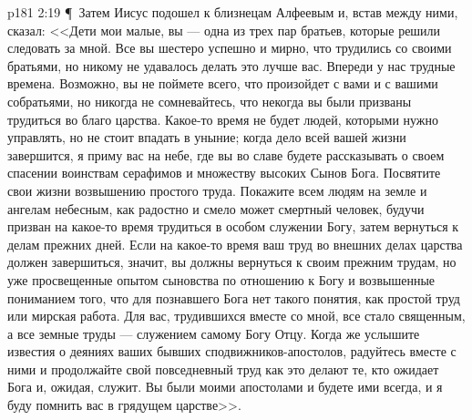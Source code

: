\vs p181 2:19 \P\ Затем Иисус подошел к близнецам Алфеевым и, встав между ними, сказал: <<Дети мои малые, вы --- одна из трех пар братьев, которые решили следовать за мной. Все вы шестеро успешно и мирно, что трудились со своими братьями, но никому не удавалось делать это лучше вас. Впереди у нас трудные времена. Возможно, вы не поймете всего, что произойдет с вами и с вашими собратьями, но никогда не сомневайтесь, что некогда вы были призваны трудиться во благо царства. Какое\hyp{}то время не будет людей, которыми нужно управлять, но не стоит впадать в уныние; когда дело всей вашей жизни завершится, я приму вас на небе, где вы во славе будете рассказывать о своем спасении воинствам серафимов и множеству высоких Сынов Бога. Посвятите свои жизни возвышению простого труда. Покажите всем людям на земле и ангелам небесным, как радостно и смело может смертный человек, будучи призван на какое\hyp{}то время трудиться в особом служении Богу, затем вернуться к делам прежних дней. Если на какое\hyp{}то время ваш труд во внешних делах царства должен завершиться, значит, вы должны вернуться к своим прежним трудам, но уже просвещенные опытом сыновства по отношению к Богу и возвышенные пониманием того, что для познавшего Бога нет такого понятия, как простой труд или мирская работа. Для вас, трудившихся вместе со мной, все стало священным, а все земные труды --- служением самому Богу Отцу. Когда же услышите известия о деяниях ваших бывших сподвижников\hyp{}апостолов, радуйтесь вместе с ними и продолжайте свой повседневный труд как это делают те, кто ожидает Бога и, ожидая, служит. Вы были моими апостолами и будете ими всегда, и я буду помнить вас в грядущем царстве>>.
